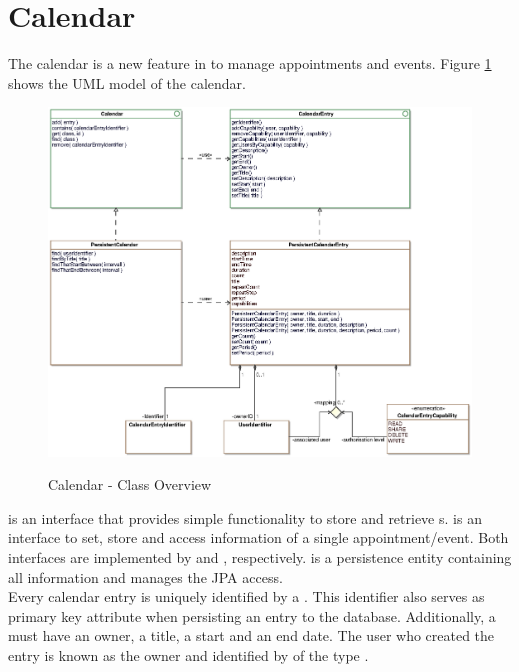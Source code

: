 \newpage
\section{Calendar}
\label{sec:calendar}

The calendar is a new feature in \salespoint{} to manage appointments and events.
Figure \ref{calendar_overview} shows the UML model of the calendar.

\begin{figure}[ht]
	\centering
  \includegraphics[width=1.0\textwidth]{images/Calendar_Overview.eps}
	\label{calendar_overview}
	\caption{Calendar - Class Overview}
\end{figure}

 is an interface that provides simple functionality to store and retrieve s.
 is an interface to set, store and access information of a single appointment/event.
Both interfaces are implemented by  and , respectively.
 is a persistence entity containing all information and  manages the JPA access.
\\

Every calendar entry is uniquely identified by a .
This identifier also serves as primary key attribute when persisting an entry to the database.
Additionally, a  must have an owner, a title, a start and an end date.
The user who created the entry is known as the owner and identified by  of the type .
\\

